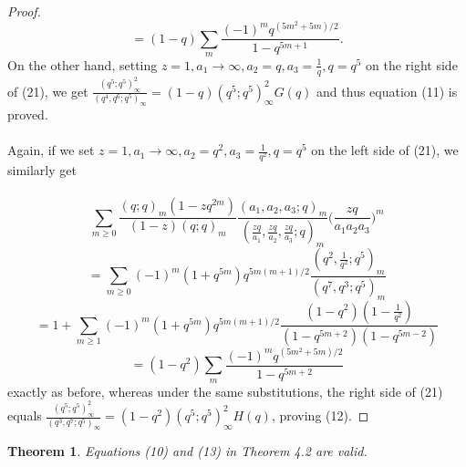 \documentclass[10pt,reqno]{amsart}
\newtheorem{theorem}{Theorem}[section]
\begin{document}
\begin{proof}
\begin{equation*}
=(1-q)\displaystyle\sum_{m}\displaystyle\frac{(-1)^mq^{(5m^2+5m)/2}}{1-q^{5m+1}}.
\end{equation*}
On the other hand, setting $z=1, a_1\rightarrow\infty, a_2=q,a_3=\displaystyle\frac{1}{q},q=q^5$ on the right side of (21), we get $\displaystyle\frac{(q^5;q^5)_{\infty}^2}{(q^4,q^6;q^5)_{\infty}}=(1-q)(q^5;q^5)_{\infty}^2G(q)$ and thus equation (11) is proved. \\ \\
Again, if we set $z=1, a_1\rightarrow\infty, a_2=q^2,a_3=\displaystyle\frac{1}{q^2},q=q^5$ on the left side of (21), we similarly get \\ \\
\begin{equation*}
\displaystyle\sum_{m\geq 0} \displaystyle\frac{(q;q)_{m}(1-zq^{2m})}{(1-z)(q;q)_m}\displaystyle\frac{(a_1,a_2,a_3;q)_m}{(\displaystyle\frac{zq}{a_1},\displaystyle\frac{zq}{a_2},\displaystyle\frac{zq}{a_3};q)_m}\Bigg(\displaystyle\frac{zq}{a_1a_2a_3}\Bigg)^m 
\end{equation*}
\begin{equation*}
=\displaystyle\sum_{m\geq 0}(-1)^m(1+q^{5m})q^{5m(m+1)/2}\displaystyle\frac{(q^2,\displaystyle\frac{1}{q^2};q^5)_m}{(q^7,q^3;q^5)_m}
\end{equation*}
\begin{equation*}
=1+\displaystyle\sum_{m\geq 1}(-1)^m(1+q^{5m})q^{5m(m+1)/2}\displaystyle\frac{(1-q^2)(1-\displaystyle\frac{1}{q^2})}{(1-q^{5m+2})(1-q^{5m-2})}
\end{equation*}
\begin{equation*}
=(1-q^2)\displaystyle\sum_{m}\displaystyle\frac{(-1)^mq^{(5m^2+5m)/2}}{1-q^{5m+2}}
\end{equation*}
exactly as before, whereas under the same substitutions, the right side of (21) equals $\displaystyle\frac{(q^5;q^5)_{\infty}^2}{(q^3,q^7;q^5)_{\infty}}=(1-q^2)(q^5;q^5)_{\infty}^2H(q)$, proving (12).
\end{proof}
\begin{theorem}
Equations (10) and (13) in Theorem 4.2 are valid. 
\end{theorem}
\end{document}
